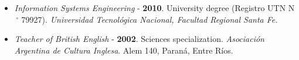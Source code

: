 \begin{itemize}
    \item \textit{Information Systems Engineering} - \textbf{2010}. University degree (Registro UTN N$\,^\circ$ 79927). \textit{Universidad Tecnológica Nacional, Facultad Regional Santa Fe.}
    \item \textit{Teacher of British English} - \textbf{2002}. Sciences specialization. \textit{Asociación Argentina de Cultura Inglesa}. Alem 140, Paraná, Entre Ríos.
\end{itemize}